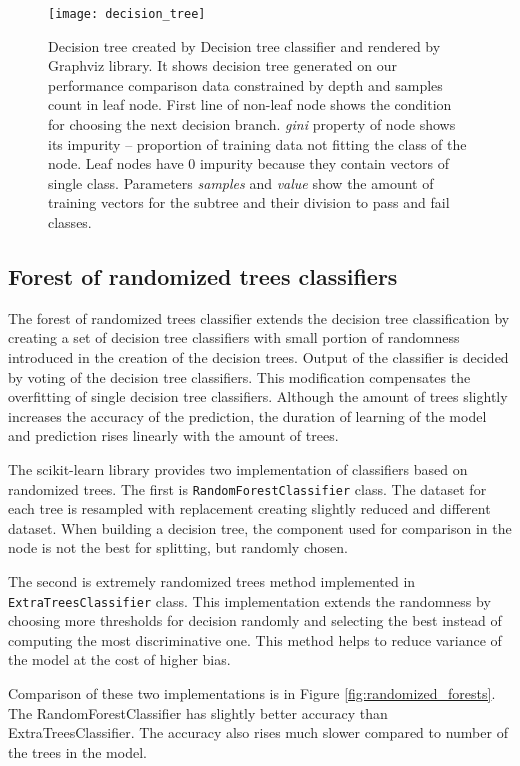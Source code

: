 \begin{figure}
  \centering
  \texttt{[image: decision\_tree]}
  \caption{Decision tree created by Decision tree classifier and rendered by
    Graphviz library. It shows decision tree generated on our
    performance comparison data constrained by depth and samples count in leaf
    node. First line of non-leaf node shows the condition for choosing the next
    decision branch. \emph{gini} property of node shows its impurity --
    proportion of training data not fitting the class of the node. Leaf nodes
    have 0 impurity because they contain vectors of single class. Parameters
    \emph{samples} and \emph{value} show the amount of training vectors for the
    subtree and their division to pass and fail classes.}
  \label{fig:decision_tree}
\end{figure}

\subsection{Forest of randomized trees classifiers}
The forest of randomized trees classifier extends the decision tree
classification by creating a set of decision tree classifiers with small portion
of randomness introduced in the creation of the decision trees. Output of the
classifier is decided by voting of the decision tree classifiers. This
modification compensates the overfitting of single decision tree classifiers.
Although the amount of trees slightly increases the accuracy of the prediction,
the duration of learning of the model and prediction rises linearly with the
amount of trees.

The scikit-learn library provides two implementation of classifiers based on
randomized trees. The first is \texttt{Random\-Forest\-Classifier} class. The
dataset for each tree is resampled with replacement creating slightly reduced
and different dataset. When building a decision tree, the component used for
comparison in the node is not the best for splitting, but randomly chosen.

The second is extremely randomized trees method implemented in
\texttt{Extra\-Trees\-Classifier} class. This implementation extends the randomness
by choosing more thresholds for decision randomly and selecting the best instead
of computing the most discriminative one. This method helps to reduce variance
of the model at the cost of higher bias.

Comparison of these two implementations is in Figure
\ref{fig:randomized_forests}. The RandomForestClassifier has slightly better
accuracy than ExtraTreesClassifier. The accuracy also rises much slower compared to
number of the trees in the model.

